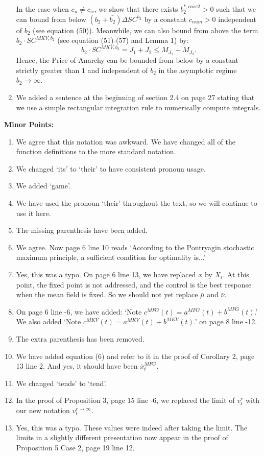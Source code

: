 \documentclass[]{article}
\begin{document}
\begin{enumerate}
	In the case when $c_u \neq c_w$, we show that there exists $b_2^{*,case2}>0$ such that we can bound from below $(b_2 + \bar{b_2}) \Delta SC^{b_2}$ by a constant $c_{num}>0$ independent of $b_2$ (see equation (50)). Meanwhile, we can also bound from above the term $b_2 \cdot SC^{MKV,b_2}$ (see equation (51)-(57) and Lemma 1) by: 
	$$ b_2 \cdot SC^{MKV,b_2} = J_1 + J_2 \leq M_{J_1} + M_{J_2}.$$
	Hence, the Price of Anarchy can be bounded from below by a constant strictly greater than $1$ and independent of $b_2$ in the asymptotic regime $b_2 \to \infty$.	
	 
	\item We added a sentence at the beginning of section 2.4 on page 27 stating that we use a simple rectangular integration rule to numerically compute integrals.
\end{enumerate}

\hspace{-7mm} \textbf{Minor Points:}
\begin{enumerate}
	\item We agree that this notation was awkward. We have changed all of the function definitions to the more standard notation.
	\item We changed `its' to `their' to have consistent pronoun usage.
	\item We added `game'.
	\item We have used the pronoun `their' throughout the text, so we will continue to use it here.
	\item The missing parenthesis have been added.
	\item We agree. Now page 6 line 10 reads `According to the Pontryagin stochastic maximum principle, a sufficient condition for optimality is...'
	\item Yes, this was a typo. On page 6 line 13, we have replaced $x$ by $X_t$. At this point, the fixed point is not addressed, and the control is the best response when the mean field is fixed. So we should not yet replace $\bar{\mu}$ and $\bar{\nu}$.
	\item On page 6 line -6, we have added: `Note $c^{MFG}(t)=a^{MFG}(t)+b^{MFG}(t)$.' We also added `Note $c^{MKV}(t)=a^{MKV}(t)+b^{MKV}(t)$.' on page 8 line -12.
	\item The extra parenthesis has been removed.
	\item We have added equation (6) and refer to it in the proof of Corollary 2, page 13 line 2. And yes, it should have been $\bar{x}_t^{MFG}$.
	\item We changed `tends' to `tend'.
	\item In the proof of Proposition 3, page 15 line -6, we replaced the limit of $v^r_t$ with our new notation $v^{r \to \infty}_t$.
	\item Yes, this was a typo. These values were indeed after taking the limit. The limits in a slightly different presentation now appear in the proof of Proposition 5 Case 2, page 19 line 12.
\end{enumerate}
\end{document}

